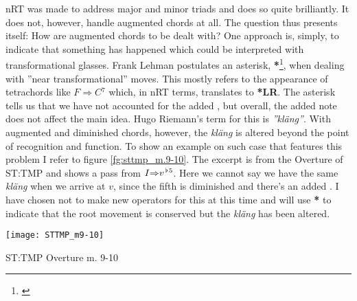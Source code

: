 \ac{nRT} was made to address major and minor triads and does so quite brilliantly. It does not, however, handle augmented chords at all. The question thus presents itself: How are augmented chords to be dealt with? One approach is, simply, to indicate that something has happened which could be interpreted with transformational glasses. Frank Lehman postulates an asterisk, \textbf{*}\footnote{\citealt{lehman_reading_2012}}, when dealing with ''near transformational'' moves. This mostly refers to the appearance of tetrachords like \(F{\Rightarrow}C{^7}\) which, in \ac{nRT} terms, translates to \textbf{*LR}. The asterisk tells us that we have not accounted for the added \textit{}, but overall, the added note does not affect the main idea. Hugo Riemann's term for this is \textit{''kläng''}. With augmented and diminished chords, however, the \textit{kläng} is altered beyond the point of recognition and function. To show an example on such case that features this problem I refer to figure \ref{fg:sttmp_m.9-10}. The excerpt is from the Overture of \ac{ST:TMP} and shows a pass from \({I}{\Rightarrow}{v}^{\hspace*{0.18ex}\flat\hspace*{0.18ex}5}\). Here we cannot say we have the same \textit{kläng} when we arrive at \(v\), since the fifth is diminished and there's an added . I have chosen not to make new operators for this at this time and will use \textbf{*} to indicate that the root movement is conserved but the \textit{kläng} has been altered. 

\begin{marginfigure}[-4cm]
\texttt{[image: STTMP\_m9-10]}
\caption{ST:TMP Overture m. 9-10}
\label{fg:sttmp_m.9-10}
\end{marginfigure}

